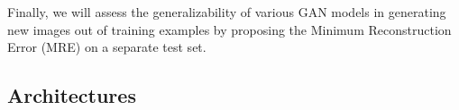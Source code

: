 Finally, we will assess the generalizability of various GAN models in generating new images out of training examples by proposing the Minimum Reconstruction Error (MRE) on a separate test set.

\subsection{Architectures}


